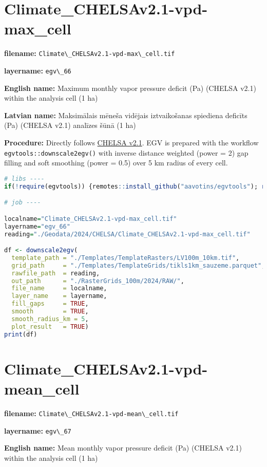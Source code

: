 \documentclass[
]{book}
\newcommand{\passthrough}[1]{#1}
\begin{document}
\section{Climate\_CHELSAv2.1-vpd-max\_cell}\label{ch06.066}

\textbf{filename:} \passthrough{\lstinline!Climate\_CHELSAv2.1-vpd-max\_cell.tif!}

\textbf{layername:} \passthrough{\lstinline!egv\_66!}

\textbf{English name:} Maximum monthly vapor pressure deficit (Pa) (CHELSA v2.1) within the analysis cell (1 ha)

\textbf{Latvian name:} Maksimālais mēneša vidējais iztvaikošanas spiediena deficīts (Pa) (CHELSA v2.1) analīzes šūnā (1 ha)

\textbf{Procedure:} Directly follows \hyperref[Ch04.11]{CHELSA v2.1}. EGV is prepared with the
workflow \passthrough{\lstinline!egvtools::downscale2egv()!} with inverse distance weighted (power = 2)
gap filling and soft smoothing (power = 0.5) over 5 km radius of every cell.

\begin{lstlisting}[language=R]
# libs ----
if(!require(egvtools)) {remotes::install_github("aavotins/egvtools"); require(egvtools)}

# job ----

localname="Climate_CHELSAv2.1-vpd-max_cell.tif"
layername="egv_66"
reading="./Geodata/2024/CHELSA/Climate_CHELSAv2.1-vpd-max_cell.tif"

df <- downscale2egv(
  template_path = "./Templates/TemplateRasters/LV100m_10km.tif",
  grid_path     = "./Templates/TemplateGrids/tikls1km_sauzeme.parquet",
  rawfile_path  = reading,
  out_path      = "./RasterGrids_100m/2024/RAW/",
  file_name     = localname,
  layer_name    = layername,
  fill_gaps     = TRUE,
  smooth        = TRUE,
  smooth_radius_km = 5,
  plot_result   = TRUE)
print(df)
\end{lstlisting}

\section{Climate\_CHELSAv2.1-vpd-mean\_cell}\label{ch06.067}

\textbf{filename:} \passthrough{\lstinline!Climate\_CHELSAv2.1-vpd-mean\_cell.tif!}

\textbf{layername:} \passthrough{\lstinline!egv\_67!}

\textbf{English name:} Mean monthly vapor pressure deficit (Pa) (CHELSA v2.1) within the analysis cell (1 ha)
\end{document}
